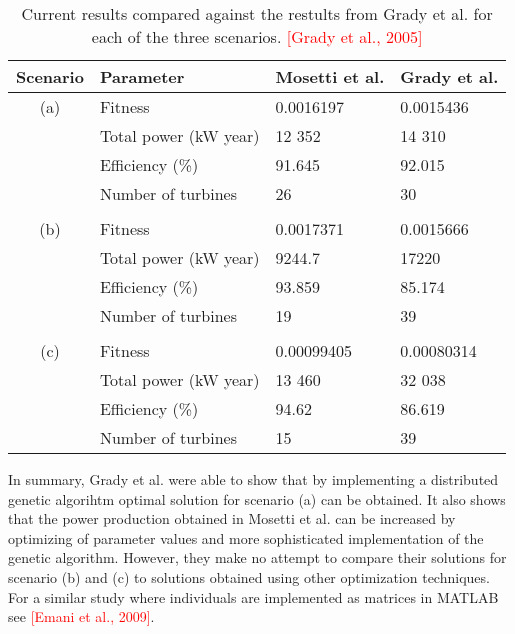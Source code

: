 \begin{table}[h!]
\begin{center}
\caption{Current results compared against the restults from Grady et al. for each of the three scenarios. \textcolor{red}{[Grady et al., 2005]}}
\label{Results Grady et al.}
\begin{tabular}{c|l|l|l}
Scenario & Parameter                    & Mosetti et al.  & Grady et al. \\ 
\hline 
(a)          & Fitness                        & 0.0016197     & 0.0015436 \\ 
              & Total power (kW year) & 12 352           & 14 310 \\ 
              & Efficiency (\%)            & 91.645            & 92.015 \\ 
              & Number of turbines     & 26                    & 30  \\ 
&&&\\
(b)         & Fitness                        & 0.0017371      & 0.0015666 \\ 
              & Total power (kW year) & 9244.7           & 17220 \\ 
              & Efficiency (\%)            & 93.859           & 85.174 \\ 
              & Number of turbines     & 19                   & 39 \\ 
&&&\\
(c)         & Fitness                        & 0.00099405   & 0.00080314 \\ 
              & Total power (kW year) & 13 460          & 32 038 \\ 
              & Efficiency (\%)            & 94.62            & 86.619 \\ 
              & Number of turbines     & 15                  & 39 \\  
\end{tabular} 
\end{center}
\end{table}


\noindent In summary, Grady et al. were able to show that by implementing a distributed genetic algorihtm optimal solution for scenario (a) can be obtained. It also shows that the power production obtained in Mosetti et al. can be increased by optimizing of parameter values and more sophisticated implementation of the genetic algorithm. However, they make no attempt to compare their solutions for scenario (b) and (c) to solutions obtained using other optimization techniques. For a similar study where individuals are implemented as matrices in MATLAB see \textcolor{red}{[Emani et al., 2009]}.\\


